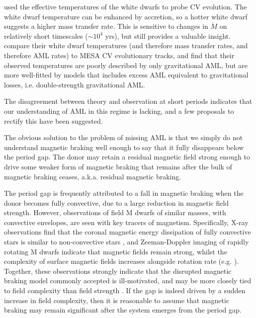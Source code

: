 \citet{Pala2017a} used the effective temperatures of the white dwarfs to probe CV evolution. The white dwarf temperature can be enhanced by accretion, so a hotter white dwarf suggests a higher mass transfer rate. This is sensitive to changes in $\dot M$ on relatively short timescales ($\sim 10^4$ yrs), but still provides a valuable insight. \citet{Pala2017a} compare their white dwarf temperatures (and therefore mass transfer rates, and therefore AML rates) to MESA CV evolutionary tracks, and find that their observed temperatures are poorly described by only gravitational AML, but are more well-fitted by models that includes excess AML equivalent to gravitational losses, i.e. double-strength gravitational AML. 

The disagreement between theory and observation at short periods indicates that our understanding of AML in this regime is lacking, and a few proposals to rectify this have been suggested.

The obvious solution to the problem of missing AML is that we simply do not understand magnetic braking well enough to say that it fully disappears below the period gap. The donor may retain a residual magnetic field strong enough to drive some weaker form of magnetic braking that remains after the bulk of magnetic braking ceases, a.k.a. residual magnetic braking. 

The period gap is frequently attributed to a fall in magnetic braking when the donor becomes fully convective, due to a large reduction in magnetic field strength. However, observations of field M dwarfs of similar masses, with convective envelopes, are seen with key tracers of magnetism. Specifically, X-ray observations find that the coronal magnetic energy dissipation of fully convective stars is similar to non-convective stars \citep{wright2016}, and Zeeman-Doppler imaging of rapidly rotating M dwarfs indicate that magnetic fields remain strong, whilst the complexity of surface magnetic fields increases alongside rotation rate (e.g. \citealt{donati2003,donati2009,marsden2011,waite2011,waite2015}). 
Together, these observations strongly indicate that the disrupted magnetic braking model commonly accepted is ill-motivated, and may be more closely tied to field complexity than field strength \citep{garraffo2018b}. If the gap is indeed driven by a sudden increase in field complexity, then it is reasonable to assume that magnetic braking may remain significant after the system emerges from the period gap. 


